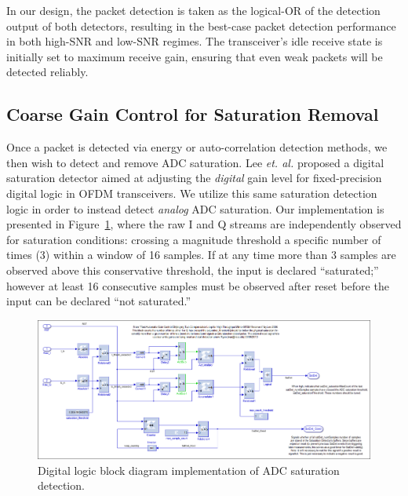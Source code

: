 	In our design, the packet detection is taken as the logical-OR of the detection output of both detectors, resulting in the best-case packet detection performance in both high-SNR and low-SNR regimes.
	The transceiver's idle receive state is initially set to maximum receive gain, ensuring that even weak packets will be detected reliably.


\subsection{Coarse Gain Control for Saturation Removal}
\label{sec_coarse_gain}

	Once a packet is detected via energy or auto-correlation detection methods, we then wish to detect and remove \ac{ADC} saturation.
	Lee \emph{et. al.} \cite{lee2006agc} proposed a digital saturation detector aimed at adjusting the \emph{digital} gain level for fixed-precision digital logic in \ac{OFDM} transceivers.
	We utilize this same saturation detection logic in order to instead detect \emph{analog} \ac{ADC} saturation.
	Our implementation is presented in Figure~\ref{fig_agc_sat_block}, where the raw I and Q streams are independently observed for saturation conditions: crossing a magnitude threshold a specific number of times (3) within a window of 16 samples.
	If at any time more than 3 samples are observed above this conservative threshold, the input is declared ``saturated;'' however at least 16 consecutive samples must be observed after reset before the input can be declared ``not saturated.''

\begin{figure}[ht] %
\centering
\includegraphics[width=1\linewidth]{./figs/agc/agc_saturation_block_implementation}
\caption{Digital logic block diagram implementation of ADC saturation detection.}
\label{fig_agc_sat_block}
\end{figure}

